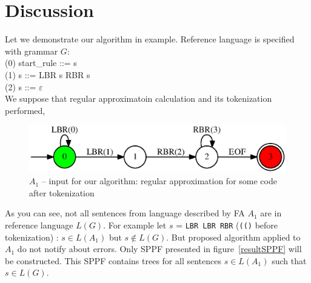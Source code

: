 \section{Discussion}

Let we demonstrate our algorithm in example. Reference language is specified with grammar $G$:\\
(0) start\_rule ::= s \\
(1) s ::= LBR s RBR s\\
(2) s ::= $\varepsilon$ \\

We suppose that regular approximatoin calculation and its tokenization performed, 

\begin{figure}
    \begin{center}
        \includegraphics[scale=0.5]{dot/in3.eps}
    \end{center}
    \caption{$A_1$ -- input for our algorithm: regular approximation for some code after tokenization} 
    \label{faApprox}
\end{figure}

As you can see, not all sentences from language described by FA $A_1$ are in reference language $L(G)$.
For example let $s$ = \verb|LBR LBR RBR| (\verb|(()| before tokenization) : $s \in L(A_1)$ but $s \notin L(G)$.
But proposed algorithm applied to $A_1$ do not notify about errors. Only SPPF presented in figure~\ref{resultSPPF} will be constructed.
This SPPF contains trees for all sentences $s \in L(A_1)$ such that $s \in L(G)$.

